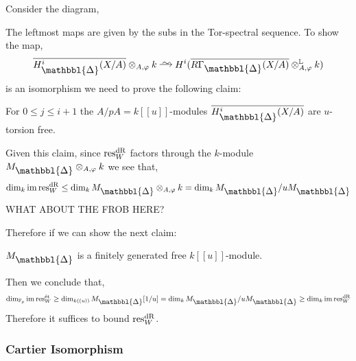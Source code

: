\documentclass[12pt]{article}
\newcommand{\Prism}{{\mathlarger{\mathbbl{\Delta}}}}
\begin{document}
Consider the diagram,
\begin{center}
\end{center}
The leftmost maps are given by the subs in the Tor-spectral sequence. To show the map,
\[ \ol{H^i_{\Prism}(X/A)} \ot_{A, \varphi} k \iso H^i(\ol{R \Gamma_{\Prism}(X/A)} \ot^{\LL}_{A, \varphi} k) \]
is an isomorphism we need to prove the following claim:
\begin{center}
For $0 \le j \le i + 1$ the $A/pA = k[[u]]$-modules $\ol{H^i_{\Prism}(X/A)}$ are $u$-torsion free.
\end{center}
Given this claim, since $\mathrm{res}_W^{\mathrm{dR}}$ factors through the $k$-module $M_{\Prism} \ot_{A, \varphi} k$ we see that,
\[ \dim_k \im{\res^{\dR}_W} \le \dim_k M_{\Prism} \ot_{A, \varphi} k = \dim_k M_{\Prism} / u M_{\Prism} \]
{\color{red} WHAT ABOUT THE FROB HERE?}

Therefore if we can show the next claim:
\begin{center}
$M_{\Prism}$ is a finitely generated free $k[[u]]$-module.
\end{center}
Then we conclude that,
\[ \dim_{\FF_p} \im{\res^{\et}_W} \ge \dim_{k((u))} M_{\Prism}[1/u] = \dim_k M_{\Prism} / u M_{\Prism} \ge \dim_k \im{\res^{\dR}_W} \]
Therefore it suffices to bound $\mathrm{res}^{\mathrm{dR}}_W$. 

\subsubsection{Cartier Isomorphism}
\end{document}
